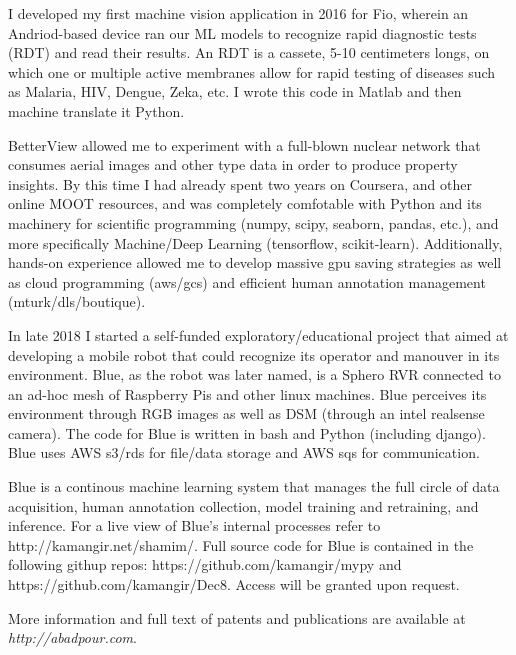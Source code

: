 I developed my first machine vision application in 2016 for Fio, wherein an Andriod-based device ran our ML models to recognize 
rapid diagnostic tests (RDT) and read their results. An RDT is a cassete, 5-10 centimeters longs, on which one or multiple active
membranes allow for rapid testing of diseases such as Malaria, HIV, Dengue, Zeka, etc. I wrote this code in Matlab and then machine 
translate it Python. 

BetterView allowed me to experiment with a full-blown nuclear network that consumes aerial images and other type data in order to 
produce property insights. By this time I had already spent two years on Coursera, and other online MOOT resources, and was completely 
comfotable with Python and its machinery for scientific programming (numpy, scipy, seaborn, pandas, etc.), and more specifically 
Machine/Deep Learning (tensorflow, scikit-learn). Additionally, hands-on experience allowed me to develop massive gpu saving strategies 
as well as cloud programming (aws/gcs) and efficient human annotation management (mturk/dls/boutique).

In late 2018 I started a self-funded exploratory/educational project that aimed at developing a mobile robot that could recognize its
operator and manouver in its environment. Blue, as the robot was later named, is a Sphero RVR connected to an ad-hoc mesh of Raspberry 
Pis and other linux machines. Blue perceives its environment through RGB images as well as DSM (through an intel realsense camera). The 
code for Blue is written in bash and Python (including django). Blue uses AWS s3/rds for file/data storage and AWS sqs for communication. 

Blue is a continous machine learning system that manages the full circle of data acquisition, human annotation collection, model training and
retraining, and inference. For a live view of Blue's internal processes refer to http://kamangir.net/shamim/. Full source code for Blue is 
contained in the following githup repos: https://github.com/kamangir/mypy and https://github.com/kamangir/Dec8. Access will be granted upon 
request. 


\vspace{0.5cm}
More information and full text of patents and publications are available at \emph{http://abadpour.com}.

\vspace{1.5cm}
